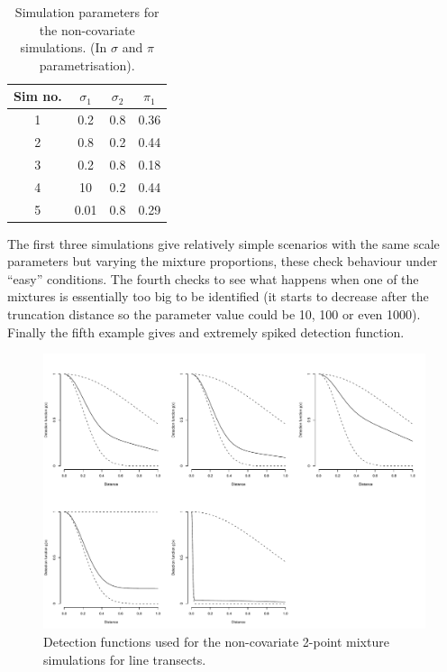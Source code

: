 \begin{table}[ht]
\centering
\begin{tabular}{c c c c}
Sim no. & $\sigma_1$ & $\sigma_2$ & $\pi_1$\\
\hline
\hline
1 & 0.2 & 0.8 &  0.36\\
2 & 0.8 & 0.2 & 0.44\\
3 & 0.2 & 0.8 & 0.18\\
4 & 10  & 0.2 & 0.44\\
5 & 0.01&  0.8 & 0.29\\
\end{tabular}
\label{mmds-nocov-simtable}
\caption{Simulation parameters for the non-covariate simulations. (In $\sigma$ and $\pi$ parametrisation).}
\end{table}

The first three simulations give relatively simple scenarios with the same scale parameters but varying the mixture proportions, these check behaviour under ``easy'' conditions. The fourth checks to see what happens when one of the mixtures is essentially too big to be identified (it starts to decrease after the truncation distance so the parameter value could be 10, 100 or even 1000). Finally the fifth example gives and extremely spiked detection function.

\begin{figure}
\centering
\includegraphics[width=6in]{mix/figs/nocov-detfcts.pdf}
\caption{Detection functions used for the non-covariate 2-point mixture simulations for line transects.}
\label{mmds-nocov-funcs}
\end{figure}

